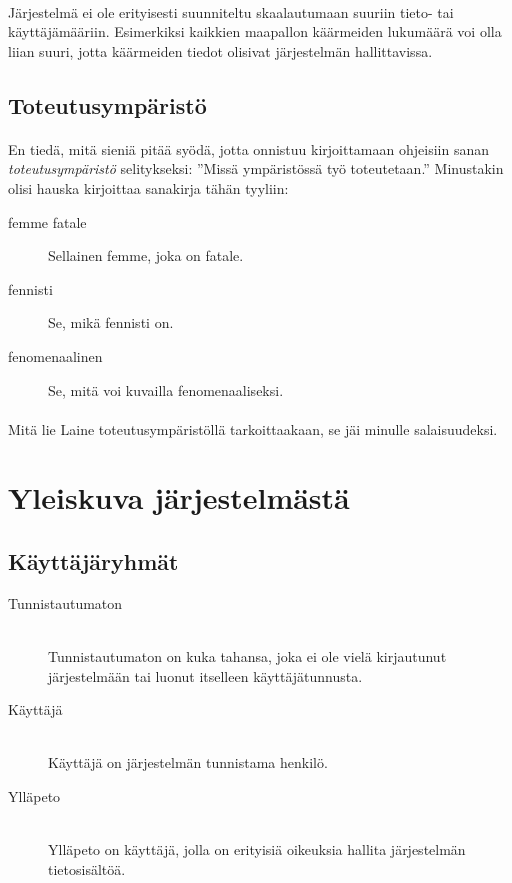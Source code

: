 \documentclass[11pt]{article}
\begin{document}
\paragraph{} Järjestelmä ei ole erityisesti suunniteltu skaalautumaan suuriin tieto- tai käyttäjämääriin. Esimerkiksi kaikkien maapallon käärmeiden lukumäärä voi olla liian suuri, jotta käärmeiden tiedot olisivat järjestelmän hallittavissa.

\subsection{Toteutusympäristö}

\paragraph{} En tiedä, mitä sieniä pitää syödä, jotta onnistuu kirjoittamaan ohjeisiin sanan \emph{toteutusympäristö} selitykseksi: ''Missä ympäristössä työ toteutetaan.'' Minustakin olisi hauska kirjoittaa sanakirja tähän tyyliin:

\begin{description}
\item[femme fatale] Sellainen femme, joka on fatale.
\item[fennisti] Se, mikä fennisti on.
\item[fenomenaalinen] Se, mitä voi kuvailla fenomenaaliseksi.
\end{description}

\paragraph{} Mitä lie Laine toteutusympäristöllä tarkoittaakaan, se jäi minulle salaisuudeksi.

\section{Yleiskuva järjestelmästä}

\subsection{Käyttäjäryhmät}

\begin{description}
\item[Tunnistautumaton] \hfill \\
Tunnistautumaton on kuka tahansa, joka ei ole vielä kirjautunut järjestelmään tai luonut itselleen käyttäjätunnusta.
\item[Käyttäjä] \hfill \\
Käyttäjä on järjestelmän tunnistama henkilö.
\item[Ylläpeto] \hfill \\
Ylläpeto on käyttäjä, jolla on erityisiä oikeuksia hallita järjestelmän tietosisältöä.
\end{description}
\end{document}
